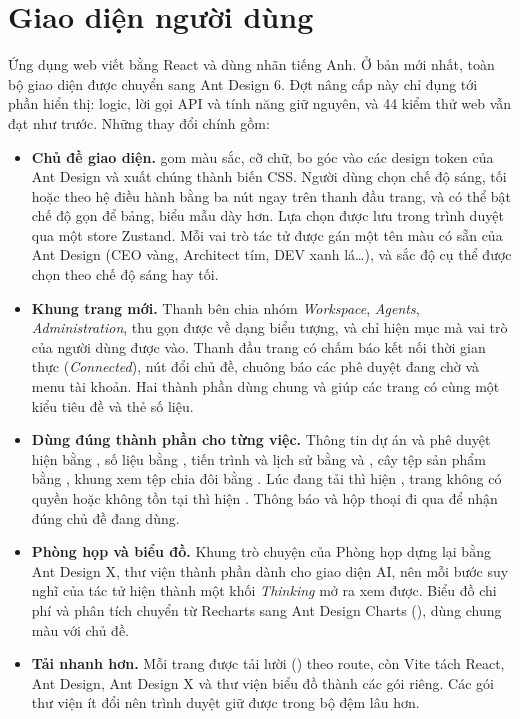 \section{Giao diện người dùng}
\label{sec:giao-dien}

Ứng dụng web viết bằng React và dùng nhãn tiếng Anh. Ở bản mới nhất, toàn bộ giao diện được chuyển sang Ant Design 6. Đợt nâng cấp này chỉ đụng tới phần hiển thị: logic, lời gọi API và tính năng giữ nguyên, và 44 kiểm thử web vẫn đạt như trước. Những thay đổi chính gồm:

\begin{itemize}
\item \textbf{Chủ đề giao diện.}  gom màu sắc, cỡ chữ, bo góc vào các design token của Ant Design và xuất chúng thành biến CSS. Người dùng chọn chế độ sáng, tối hoặc theo hệ điều hành bằng ba nút ngay trên thanh đầu trang, và có thể bật chế độ gọn để bảng, biểu mẫu dày hơn. Lựa chọn được lưu trong trình duyệt qua một store Zustand. Mỗi vai trò tác tử được gán một tên màu có sẵn của Ant Design (CEO vàng, Architect tím, DEV xanh lá\ldots), và sắc độ cụ thể được chọn theo chế độ sáng hay tối.
\item \textbf{Khung trang mới.} Thanh bên chia nhóm \textit{Workspace}, \textit{Agents}, \textit{Administration}, thu gọn được về dạng biểu tượng, và chỉ hiện mục mà vai trò của người dùng được vào. Thanh đầu trang có chấm báo kết nối thời gian thực (\textit{Connected}), nút đổi chủ đề, chuông báo các phê duyệt đang chờ và menu tài khoản. Hai thành phần dùng chung  và  giúp các trang có cùng một kiểu tiêu đề và thẻ số liệu.
\item \textbf{Dùng đúng thành phần cho từng việc.} Thông tin dự án và phê duyệt hiện bằng , số liệu bằng , tiến trình và lịch sử bằng  và , cây tệp sản phẩm bằng , khung xem tệp chia đôi bằng . Lúc đang tải thì hiện , trang không có quyền hoặc không tồn tại thì hiện . Thông báo và hộp thoại đi qua  để nhận đúng chủ đề đang dùng.
\item \textbf{Phòng họp và biểu đồ.} Khung trò chuyện của Phòng họp dựng lại bằng Ant Design X, thư viện thành phần dành cho giao diện AI, nên mỗi bước suy nghĩ của tác tử hiện thành một khối \textit{Thinking} mở ra xem được. Biểu đồ chi phí và phân tích chuyển từ Recharts sang Ant Design Charts (), dùng chung màu với chủ đề.
\item \textbf{Tải nhanh hơn.} Mỗi trang được tải lười () theo route, còn Vite tách React, Ant Design, Ant Design X và thư viện biểu đồ thành các gói riêng. Các gói thư viện ít đổi nên trình duyệt giữ được trong bộ đệm lâu hơn.
\end{itemize}

